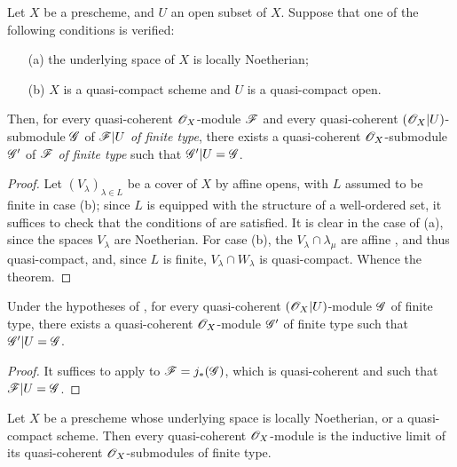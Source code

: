 \begin{theorem}[9.4.7]
\label{I.9.4.7}
Let $X$ be a prescheme, and $U$ an open subset of $X$. Suppose that one of the following conditions is verified:
\begin{enumerate}
  \item[{\rm(a)}] the underlying space of $X$ is locally Noetherian;
  \item[{\rm(b)}] $X$ is a quasi-compact scheme and $U$ is a quasi-compact open.
\end{enumerate}
Then, for every quasi-coherent $\mathscr{O}_X$-module $\mathscr{F}$ and every quasi-coherent
$(\mathscr{O}_X|U)$-submodule $\mathscr{G}$ of $\mathscr{F}|U$ \emph{of finite type}, there exists a
quasi-coherent $\mathscr{O}_X$-submodule $\mathscr{G}'$ of $\mathscr{F}$ \emph{of finite type} such that
$\mathscr{G}'|U=\mathscr{G}$.
\end{theorem}

\begin{proof}
Let
$(V_\lambda)_{\lambda\in L}$ be a cover of $X$ by affine opens, with $L$ assumed to be finite
in case (b); since $L$ is equipped with the structure of a well-ordered set, it suffices to
check that the conditions of  are satisfied. It is clear in the case of (a),
since the spaces $V_\lambda$ are Noetherian. For case (b), the $V_\lambda\cap\lambda_\mu$ are
affine , and thus quasi-compact, and, since $L$ is finite,
$V_\lambda\cap W_\lambda$ is quasi-compact. Whence the theorem.
\end{proof}

\begin{corollary}[9.4.8]
\label{I.9.4.8}
Under the hypotheses of , for every quasi-coherent $(\mathscr{O}_X|U)$-module
$\mathscr{G}$ of finite type, there exists a quasi-coherent $\mathscr{O}_X$-module $\mathscr{G}'$ of finite
type such that $\mathscr{G}'|U=\mathscr{G}$.
\end{corollary}

\begin{proof}
It suffices to apply  to $\mathscr{F}=j_*(\mathscr{G})$, which is quasi-coherent
 and such that $\mathscr{F}|U=\mathscr{G}$.
\end{proof}

\begin{corollary}[9.4.9]
\label{I.9.4.9}
Let $X$ be a prescheme whose underlying space is locally Noetherian, or a quasi-compact
scheme. Then every quasi-coherent $\mathscr{O}_X$-module is the inductive limit of its quasi-coherent
$\mathscr{O}_X$-submodules of finite type.
\end{corollary}

